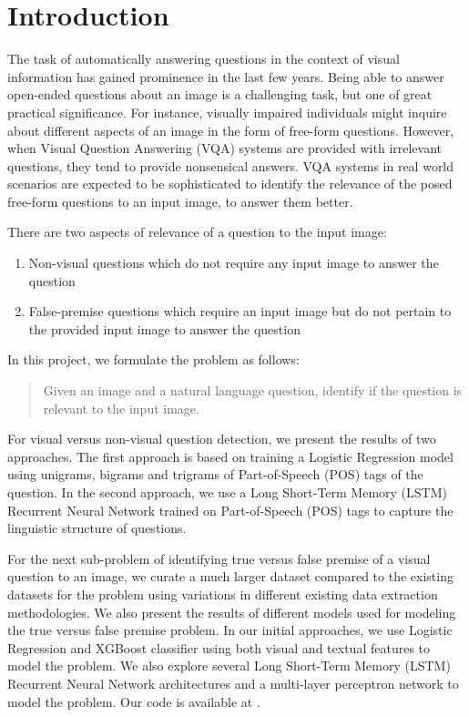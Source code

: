\section{Introduction}

The task of automatically answering questions in the context of visual information has gained prominence in the last few years. Being able to answer open-ended questions about an image is a challenging task, but one of great practical significance. For instance, visually impaired individuals might inquire about different aspects of an image in the form of free-form questions. However, when Visual Question Answering (VQA) systems are provided with irrelevant questions, they tend to provide nonsensical answers. VQA systems in real world scenarios are expected to be sophisticated to identify the relevance of the posed free-form questions to an input image, to answer them better. 

There are two aspects of relevance of a question to the input image:
\begin{enumerate}
\item Non-visual questions which do not require any input image to answer the question
\item False-premise questions which require an input image but do not pertain to the provided input image to answer the question\\
\end{enumerate}
In this project, we formulate the problem as follows:
\begin{quotation}
\noindent Given an image and a natural language question, identify if the question is relevant to the input image.
\end{quotation}

For visual versus non-visual question detection, we present the results of two approaches. The first approach is based on training a Logistic Regression model using unigrams, bigrams and trigrams of Part-of-Speech (POS) tags of the question. In the second approach, we use a Long Short-Term Memory (LSTM) Recurrent Neural Network trained on Part-of-Speech (POS) tags to capture the linguistic structure of questions. 

For the next sub-problem of identifying true versus false premise of a visual question to an image, we curate a much larger dataset compared to the existing datasets for the problem using variations in different existing data extraction methodologies. We also present the results of different models used for modeling the true versus false premise problem. In our initial approaches, we use Logistic Regression and XGBoost classifier using both visual and textual features to model the problem. We also explore several Long Short-Term Memory (LSTM) Recurrent Neural Network architectures and a multi-layer perceptron network to model the problem. Our code is available at \cite{github_link}. 

